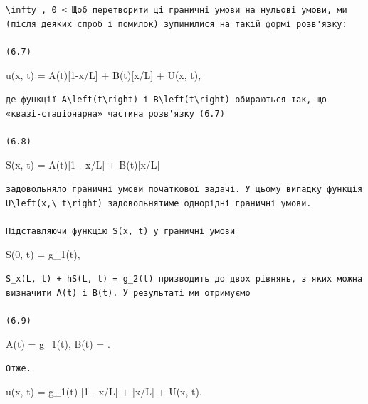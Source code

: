 \documentclass[
  ukrainian,
]{article}
\begin{document}
\begin{verbatim}
\infty , 0 < Щоб перетворити ці граничні умови на нульові умови, ми (після деяких спроб і помилок) зупинилися на такій формі розв'язку:

(6.7)
\end{verbatim}

u(x, t) = A(t){[}1-x/L{]} + B(t){[}x/L{]} + U(x, t),

\begin{verbatim}
де функції A\left(t\right) і B\left(t\right) обираються так, що «квазі-стаціонарна» частина розв'язку (6.7)

(6.8)
\end{verbatim}

S(x, t) = A(t){[}1 - x/L{]} + B(t){[}x/L{]}

\begin{verbatim}
задовольняло граничні умови початкової задачі. У цьому випадку функція U\left(x,\ t\right) задовольнятиме однорідні граничні умови.

Підставляючи функцію S(x, t) у граничні умови
\end{verbatim}

S(0, t) = g\_1(t),

\begin{verbatim}
S_x(L, t) + hS(L, t) = g_2(t) призводить до двох рівнянь, з яких можна визначити A(t) і B(t). У результаті ми отримуємо

(6.9)
\end{verbatim}

A(t) = g\_1(t), B(t) = .

\begin{verbatim}
Отже.
\end{verbatim}

u(x, t) = g\_1(t) {[}1 - x/L{]} + 
{[}x/L{]} + U(x, t).
\end{document}
